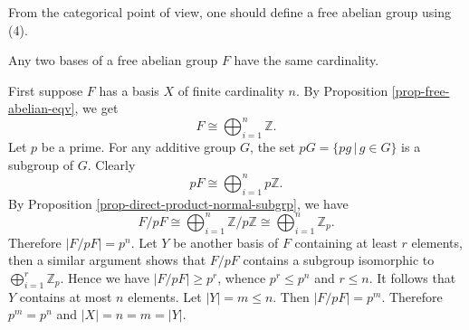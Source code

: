 \begin{remark}
	From the categorical point of view, one should define a free abelian group using (4). 
\end{remark}


\begin{theorem} \label{thm-free-abelian-same-card}
	Any two bases of a free abelian group $F$ have the same cardinality. 
\end{theorem}

\begin{sketch}
	First suppose $F$ has a basis $X$ of finite cardinality $n$. By Proposition \ref{prop-free-abelian-eqv}, we get $$F \cong \bigoplus_{i=1}^n\mathbb{Z}.$$ Let $p$ be a prime. For any additive group $G$, the set $pG = \{pg \,|\, g \in G\}$ is a subgroup of $G$. Clearly
	\begin{equation*}
		pF \cong \bigoplus_{i=1}^n p\mathbb{Z}.
	\end{equation*} By Proposition \ref{prop-direct-product-normal-subgrp}, we have $$F/pF \cong \bigoplus_{i=1}^n\mathbb{Z}/p\mathbb{Z}  \cong \bigoplus_{i=1}^n \mathbb{Z}_p.$$
	Therefore $|F/pF| = p^n$. Let $Y$ be another basis of $F$ containing at least $r$ elements, then a similar argument shows that $F/pF$ contains a subgroup isomorphic to $\bigoplus_{i=1}^r \mathbb{Z}_p$. Hence we have  $|F/pF| \geq p^r$, whence $p^r \le p^n$ and $r \le n$. It follows that $Y$ contains at most $n$ elements. Let $|Y| = m\leq n$. Then $|F/pF| = p^m$. Therefore $p^m = p^n$ and $|X| = n = m = |Y|$.
	

\end{sketch}
